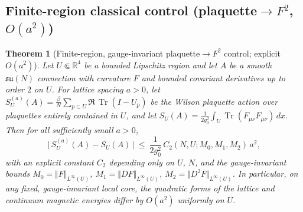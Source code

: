\documentclass[11pt]{amsart}
\theoremstyle{plain}
\newtheorem{theorem}{Theorem}[section]
\theoremstyle{definition}
\theoremstyle{remark}
\DeclareMathOperator{\Tr}{Tr}
\renewcommand{\tfrac}[2]{\textstyle\frac{#1}{#2}}
\begin{document}
\subsection*{Finite-region classical control (plaquette$\to F^2$, $O(a^2)$)}
\begin{theorem}[Finite-region, gauge-invariant plaquette$\to F^2$ control; explicit $O(a^2)$]\label{DEC:plaquette-F2}
Let $U\Subset\mathbb R^4$ be a bounded Lipschitz region and let $A$ be a smooth $\mathfrak{su}(N)$ connection with curvature $F$ and bounded covariant derivatives up to order $2$ on $U$. For lattice spacing $a>0$, let $S^{(a)}_U(A)=\tfrac{\beta}{N}\sum_{p\subset U}\Re\,\Tr(I-U_p)$ be the Wilson plaquette action over plaquettes entirely contained in $U$, and let $S_U(A)=\tfrac{1}{2g_0^2}\int_U \Tr(F_{\mu\nu}F_{\mu\nu})\,dx$. Then for all sufficiently small $a>0$,
\[
  \big\lvert\,S^{(a)}_U(A)-S_U(A)\,\big\rvert\ \le\ \frac{1}{2g_0^2}\,C_2(N,U;M_0,M_1,M_2)\,a^2,
\]
with an explicit constant $C_2$ depending only on $U$, $N$, and the gauge-invariant bounds $M_0=\Vert F\Vert_{L^\infty(U)}$, $M_1=\Vert DF\Vert_{L^\infty(U)}$, $M_2=\Vert D^2F\Vert_{L^\infty(U)}$. In particular, on any fixed, gauge-invariant local core, the quadratic forms of the lattice and continuum magnetic energies differ by $O(a^2)$ uniformly on $U$.
\end{theorem}
\end{document}
